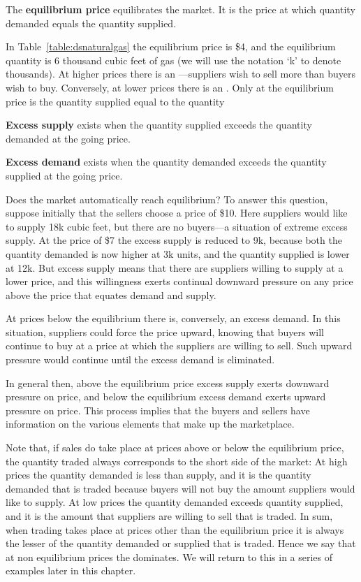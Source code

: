 \begin{DefBox}
The \textbf{equilibrium price} equilibrates the market. It is the price at which quantity demanded equals the quantity supplied.
\end{DefBox}

In Table~\ref{table:dsnaturalgas} the equilibrium price is \$4, and the equilibrium quantity is 6 thousand cubic feet of gas (we will use the notation `k' to denote thousands). At higher prices there is an ---suppliers wish to sell more than buyers wish to buy. Conversely, at lower prices there is an . Only at the equilibrium price is the quantity supplied equal to the quantity

\begin{DefBox}
\textbf{Excess supply} exists when the quantity supplied exceeds the quantity demanded at the going price.

\textbf{Excess demand} exists when the quantity demanded exceeds the quantity supplied at the going price.
\end{DefBox}

Does the market automatically reach equilibrium? To answer this question, suppose initially that the sellers choose a price of \$10. Here suppliers would like to supply 18k cubic feet, but there are no buyers---a situation of extreme excess supply. At the price of \$7 the excess supply is reduced to 9k, because both the quantity demanded is now higher at 3k units, and the quantity supplied is lower at 12k. But excess supply means that there are suppliers willing to supply at a lower price, and this willingness exerts continual downward pressure on any price above the price that equates demand and supply.

At prices below the equilibrium there is, conversely, an excess demand. In this situation, suppliers could force the price upward, knowing that buyers will continue to buy at a price at which the suppliers are willing to sell. Such upward pressure would continue until the excess demand is eliminated.

In general then, above the equilibrium price excess supply exerts downward pressure on price, and below the equilibrium excess demand exerts upward pressure on price. This process implies that the buyers and sellers have information on the various elements that make up the marketplace.

Note that, if sales do take place at prices above or below the equilibrium price, the quantity traded always corresponds to the short side of the market: At high prices the quantity demanded is less than supply, and it is the quantity demanded that is traded because buyers will not buy the amount suppliers would like to supply. At low prices the quantity demanded exceeds quantity supplied, and it is the amount that suppliers are willing to sell that is traded. In sum, when trading takes place at prices other than the equilibrium price it is always the lesser of the quantity demanded or supplied that is traded. Hence we say that at non equilibrium prices the  dominates. We will return to this in a series of examples later in this chapter.

